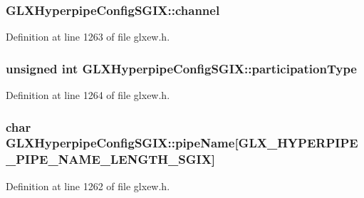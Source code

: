 \subsubsection[{channel}]{ G\+L\+X\+Hyperpipe\+Config\+S\+G\+I\+X\+::channel}\label{struct_g_l_x_hyperpipe_config_s_g_i_x_abc812d8796ba89d5de4e33b3532d8335}


Definition at line 1263 of file glxew.\+h.

\hypertarget{struct_g_l_x_hyperpipe_config_s_g_i_x_a093cfaaec305531f66e1120929b5b01b}{}
\subsubsection[{participation\+Type}]{\setlength{\rightskip}{0pt plus 5cm}unsigned {\bf int} G\+L\+X\+Hyperpipe\+Config\+S\+G\+I\+X\+::participation\+Type}\label{struct_g_l_x_hyperpipe_config_s_g_i_x_a093cfaaec305531f66e1120929b5b01b}


Definition at line 1264 of file glxew.\+h.

\hypertarget{struct_g_l_x_hyperpipe_config_s_g_i_x_a9e3748f92005cac81cb44d4c67acccb8}{}
\subsubsection[{pipe\+Name}]{\setlength{\rightskip}{0pt plus 5cm}char G\+L\+X\+Hyperpipe\+Config\+S\+G\+I\+X\+::pipe\+Name\mbox{[}{\bf G\+L\+X\+\_\+\+H\+Y\+P\+E\+R\+P\+I\+P\+E\+\_\+\+P\+I\+P\+E\+\_\+\+N\+A\+M\+E\+\_\+\+L\+E\+N\+G\+T\+H\+\_\+\+S\+G\+I\+X}\mbox{]}}\label{struct_g_l_x_hyperpipe_config_s_g_i_x_a9e3748f92005cac81cb44d4c67acccb8}


Definition at line 1262 of file glxew.\+h.

\hypertarget{struct_g_l_x_hyperpipe_config_s_g_i_x_afe9288e75dc1ae5e0f33eff978d7024d}{}
